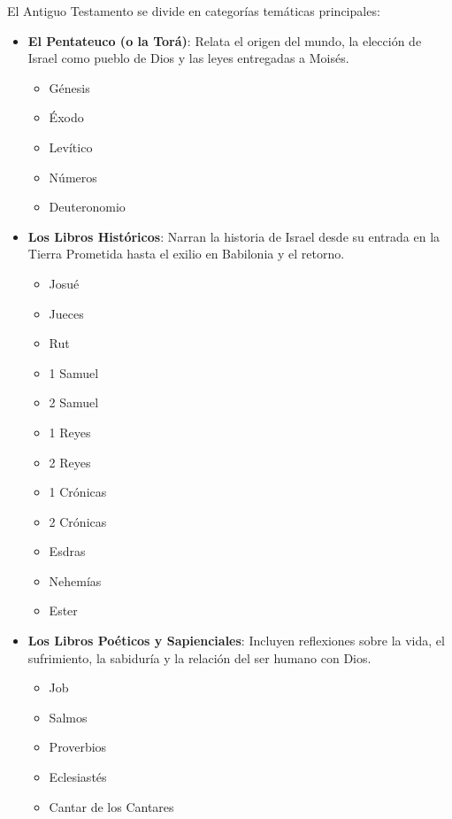 \documentclass[oneside,  10pt]{book}
\begin{document}
El Antiguo Testamento se divide en categorías temáticas principales:
\begin{itemize}
	\item \textbf{El Pentateuco (o la Torá)}: Relata el origen del mundo, la elección de Israel como pueblo de Dios y las leyes entregadas a Moisés.
	\begin{itemize}
		\item Génesis
		\item Éxodo
		\item Levítico
		\item Números
		\item Deuteronomio
	\end{itemize}
	
	\item \textbf{Los Libros Históricos}: Narran la historia de Israel desde su entrada en la Tierra Prometida hasta el exilio en Babilonia y el retorno.
	\begin{itemize}
		\item Josué
		\item Jueces
		\item Rut
		\item 1 Samuel
		\item 2 Samuel
		\item 1 Reyes
		\item 2 Reyes
		\item 1 Crónicas
		\item 2 Crónicas
		\item Esdras
		\item Nehemías
		\item Ester
	\end{itemize}
	
	\item \textbf{Los Libros Poéticos y Sapienciales}: Incluyen reflexiones sobre la vida, el sufrimiento, la sabiduría y la relación del ser humano con Dios.
	\begin{itemize}
		\item Job
		\item Salmos
		\item Proverbios
		\item Eclesiastés
		\item Cantar de los Cantares
	\end{itemize}
	

\end{itemize}
\end{document}

